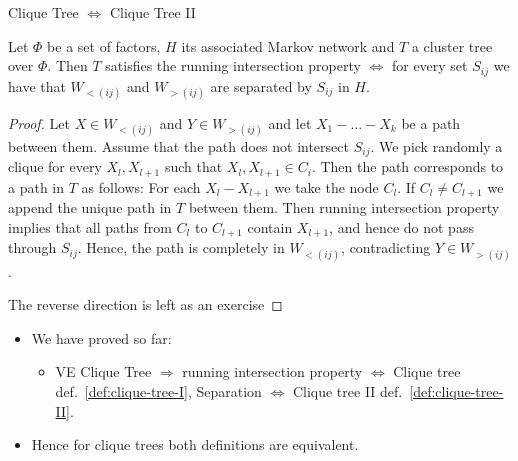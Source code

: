 \begin{frame}{Clique Tree $\Leftrightarrow$ Clique Tree II}
    \begin{theorem}
        \label{thm:rip-separation}
        Let $\Phi$ be a set of factors, $H$ its associated Markov network and $T$ a cluster tree over $\Phi$.
        Then $T$ satisfies the running intersection property $\Leftrightarrow$ for every set $S_{ij}$ we have that $W_{<(ij)}$ and $W_{>(ij)}$ are separated by $S_{ij}$ in $H$.
    \end{theorem}
\pause
    \begin{proof}
        Let $X \in W_{<(ij)}$ and $Y \in W_{>(ij)}$ and let $X_1 - \dots - X_k$ be a path between them.
        \pause
        Assume that the path does not intersect $S_{ij}$.
        \pause
        We pick randomly a clique for every $X_l, X_{l+1}$ such that $X_l,X_{l+1} \in C_i$.
        \pause
        Then the path corresponds to a path in $T$ as follows:
        For each $X_l - X_{l+1}$ we take the node $C_l$. If $C_l \neq C_{l+1}$ we append the unique path in $T$ between them.
        \pause
        Then running intersection property implies that all paths from $C_l$ to $C_{l+1}$ contain $X_{l+1}$, and hence do not pass through $S_{ij}$.
        Hence, the path is completely in $W_{<(ij)}$, contradicting $Y \in W_{>(ij)}$.

        \pause
        The reverse direction is left as an exercise
    \end{proof}
    \pause
\begin{itemize}
\item We have proved so far: 
\begin{itemize}
    \item VE Clique Tree $\Rightarrow$ running intersection property $\Leftrightarrow $ Clique tree def.~\ref{def:clique-tree-I}, Separation $\Leftrightarrow$ Clique tree II def.~\ref{def:clique-tree-II}.
\end{itemize}
\pause \item Hence for clique trees both definitions are equivalent.
\end{itemize}
\end{frame}
